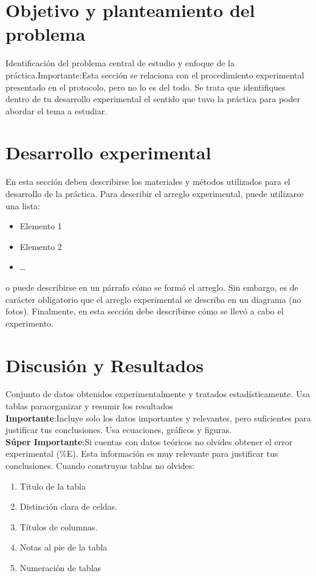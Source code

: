\documentclass[%
 reprint,
 amsmath,amssymb,
 aps,
]{revtex4-2}
\begin{document}
\section{Objetivo y planteamiento del problema}

Identificación del problema central de estudio y enfoque de la práctica.Importante:Esta  sección  se  relaciona  con  el  procedimiento  experimental  presentado  en  el protocolo, pero no lo es del todo. Se trata que identifiques dentro de tu desarrollo experimental el sentido que tuvo la práctica para poder abordar el tema a estudiar.

\section{Desarrollo experimental}

En esta secci\'on deben describirse los materiales y métodos utilizados para el desarrollo de la práctica. Para describir el arreglo experimental, puede utilizarse una lista:
\begin{itemize}
    \item Elemento 1
    \item Elemento 2
    \item \ldots
\end{itemize}
o puede describirse en un párrafo cómo se formó el arreglo. Sin embargo, es de carácter obligatorio que el arreglo experimental se describa en un diagrama (no fotos).
Finalmente, en esta secci\'on debe describirse cómo se llevó a cabo el experimento.
\section{Discusión y Resultados}
Conjunto  de  datos  obtenidos  experimentalmente  y  tratados  estadísticamente.  Usa  tablas  paraorganizar y resumir los resultados\\\textbf{Importante}:Incluye  solo  los  datos  importantes  y  relevantes,  pero  suficientes  para  justificar  tus conclusiones. Usa ecuaciones, gráficos y figuras.\\\textbf{Súper  Importante}:Si  cuentas  con  datos  teóricos  no  olvides  obtener  el  error  experimental  (\%E). Esta información es muy relevante para justificar tus conclusiones.
Cuando construyas tablas no olvides:
\begin{enumerate}
    \item  Titulo de la tabla
    \item Distinción clara de celdas.
    \item Títulos de columnas.
    \item Notas al pie de la tabla
    \item Numeración de tablas
\end{enumerate}
\end{document}
